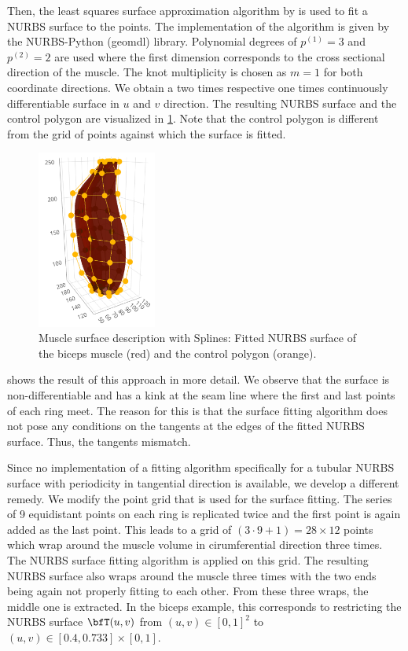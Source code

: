 Then, the least squares surface approximation algorithm by \cite{piegl2012nurbs} is used to fit a NURBS surface to the points. The implementation of the algorithm is given by the NURBS-Python (geomdl) library. Polynomial degrees of $p^{(1)} = 3$ and $p^{(2)}=2$ are used where the first dimension corresponds to the cross sectional direction of the muscle. The knot multiplicity is chosen as $m=1$ for both coordinate directions. We obtain a two times respective one times continuously differentiable surface in $u$ and $v$ direction. 
The resulting NURBS surface and the control polygon are visualized in \cref{fig:biceps_splines_control_points}. Note that the control polygon is different from the grid of points against which the surface is fitted.
%
\begin{figure}%
  \centering%
  \includegraphics[width=0.35\textwidth]{images/fiber_creation/splines01red.png}%
  \caption{Muscle surface description with Splines: Fitted NURBS surface of the biceps muscle (red) and the control polygon (orange).}%
  \label{fig:biceps_splines_control_points}%
\end{figure}%

 shows the result of this approach in more detail. We observe that the surface is non-differentiable and has a kink at the seam line where the first and last points of each ring meet. The reason for this is that the surface fitting algorithm does not pose any conditions on the tangents at the edges of the fitted NURBS surface.  Thus, the tangents mismatch.

Since no implementation of a fitting algorithm specifically for a tubular NURBS surface with periodicity in tangential direction is available, we develop a different remedy. We modify the point grid that is used for the surface fitting. The series of 9 equidistant points on each ring is replicated twice and the first point is again added as the last point. This leads to a grid of $(3\cdot 9+1) = 28 \times 12$ points which wrap around the muscle volume in cirumferential direction three times. The NURBS surface fitting algorithm is applied on this grid. The resulting NURBS surface also wraps around the muscle three times with the two ends being again not properly fitting to each other. From these three wraps, the middle one is extracted. In the biceps example, this corresponds to restricting the NURBS surface $\bfT(u,v)$ from $(u,v) \in [0,1]^2$ to $(u,v) \in [0.4,0.733]\times [0,1]$.

